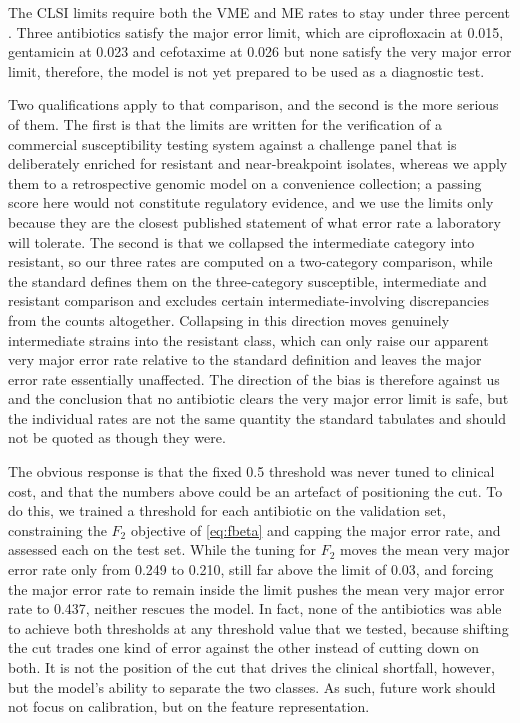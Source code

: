 \documentclass[journal]{IEEEtran}
\begin{document}
The CLSI limits require both the VME and ME rates to stay under three percent
\cite{clsi_m52}. Three antibiotics satisfy the major error limit, which are
ciprofloxacin at 0.015, gentamicin at 0.023 and cefotaxime at 0.026 but none satisfy
the very major error limit, therefore, the model is not yet prepared to be used as a
diagnostic test.

Two qualifications apply to that comparison, and the second is the more serious of
them. The first is that the limits are written for the verification of a commercial
susceptibility testing system against a challenge panel that is deliberately enriched
for resistant and near-breakpoint isolates, whereas we apply them to a retrospective
genomic model on a convenience collection; a passing score here would not constitute
regulatory evidence, and we use the limits only because they are the closest published
statement of what error rate a laboratory will tolerate. The second is that we
collapsed the intermediate category into resistant, so our three rates are computed on
a two-category comparison, while the standard defines them on the three-category
susceptible, intermediate and resistant comparison and excludes certain
intermediate-involving discrepancies from the counts altogether. Collapsing in this
direction moves genuinely intermediate strains into the resistant class, which can only
raise our apparent very major error rate relative to the standard definition and
leaves the major error rate essentially unaffected. The direction of the bias is
therefore against us and the conclusion that no antibiotic clears the very major error
limit is safe, but the individual rates are not the same quantity the standard
tabulates and should not be quoted as though they were.

The obvious response is that the fixed 0.5 threshold was never tuned to clinical
cost, and that the numbers above could be an artefact of positioning the cut. To do
this, we trained a threshold for each antibiotic on the validation set, constraining
the $F_2$ objective of \eqref{eq:fbeta} and capping the major error rate,
and assessed each on the test set. While the tuning for $F_2$ moves the mean very
major error rate only from 0.249 to 0.210, still far above the limit of 0.03, and
forcing the major error rate to remain inside the limit pushes the mean very major
error rate to 0.437, neither rescues the model. In fact, none of the antibiotics was
able to achieve both thresholds at any threshold value that we tested, because
shifting the cut trades one kind of error against the other instead of cutting down
on both. It is not the position of the cut that drives the clinical shortfall,
however, but the model's ability to separate the two classes. As such, future work
should not focus on calibration, but on the feature representation.
\end{document}
